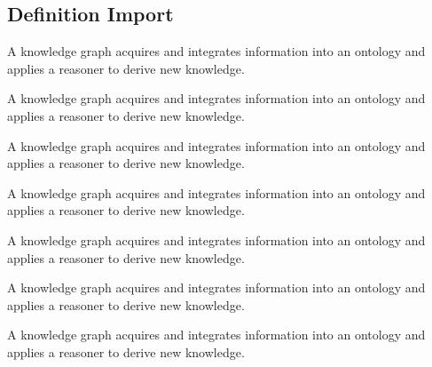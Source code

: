 \subsection{Definition Import}

\begin{definition}
\label{def:knowledge-graph0}
A knowledge graph acquires and integrates information into an ontology and applies a reasoner to derive new knowledge.
\end{definition}
\begin{definition}
\label{def:knowledge-graph1}
A knowledge graph acquires and integrates information into an ontology and applies a reasoner to derive new knowledge.
\end{definition}
\begin{definition}
\label{def:knowledge-graph2}
A knowledge graph acquires and integrates information into an ontology and applies a reasoner to derive new knowledge.
\end{definition}
\begin{definition}
\label{def:knowledge-graph3}
A knowledge graph acquires and integrates information into an ontology and applies a reasoner to derive new knowledge.
\end{definition}
\begin{definition}
\label{def:knowledge-graph4}
A knowledge graph acquires and integrates information into an ontology and applies a reasoner to derive new knowledge.
\end{definition}
\begin{definition}
\label{def:knowledge-graph5}
A knowledge graph acquires and integrates information into an ontology and applies a reasoner to derive new knowledge.
\end{definition}
\begin{definition}
\label{def:knowledge-graph6}
A knowledge graph acquires and integrates information into an ontology and applies a reasoner to derive new knowledge.
\end{definition}
